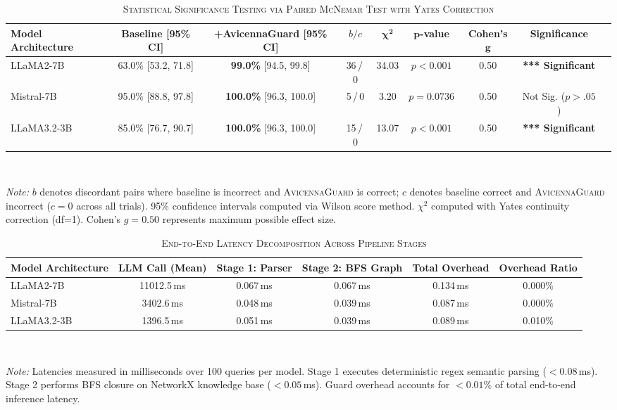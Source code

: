 \documentclass[journal]{IEEEtran}
\begin{document}
\begin{table}[t]
\centering
\caption{\textsc{Statistical Significance Testing via Paired McNemar Test with Yates Correction}}
\label{tab:mcnemar_significance}
\begin{tabular}{lcccccccc}
  \toprule
  \textbf{Model Architecture} & \textbf{Baseline [95\% CI]} & \textbf{+AvicennaGuard [95\% CI]} & \textbf{$b / c$} & $\boldsymbol{\chi^2}$ & $\boldsymbol{p}$\textbf{-value} & \textbf{Cohen's} $\boldsymbol{g}$ & \textbf{Significance} \\
  \midrule
  LLaMA2-7B & 63.0\% [53.2, 71.8] & \textbf{99.0\%} [94.5, 99.8] & 36\,/\,0 & 34.03 & $p < 0.001$ & 0.50 & \textbf{*** Significant} \\
  Mistral-7B & 95.0\% [88.8, 97.8] & \textbf{100.0\%} [96.3, 100.0] & 5\,/\,0 & 3.20 & $p = 0.0736$ & 0.50 & Not Sig. ($p > .05$) \\
  LLaMA3.2-3B & 85.0\% [76.7, 90.7] & \textbf{100.0\%} [96.3, 100.0] & 15\,/\,0 & 13.07 & $p < 0.001$ & 0.50 & \textbf{*** Significant} \\
  \bottomrule
\end{tabular}
\vspace{1mm}
\\[-1mm]
\raggedright
\footnotesize{\textit{Note:} $b$ denotes discordant pairs where baseline is incorrect and \textsc{AvicennaGuard} is correct; $c$ denotes baseline correct and \textsc{AvicennaGuard} incorrect ($c=0$ across all trials). 95\% confidence intervals computed via Wilson score method. $\chi^2$ computed with Yates continuity correction (df=1). Cohen's $g = 0.50$ represents maximum possible effect size.}
\end{table}

\vspace{0.5cm}

\begin{table}[t]
\centering
\caption{\textsc{End-to-End Latency Decomposition Across Pipeline Stages}}
\label{tab:latency_breakdown}
\begin{tabular}{lccccc}
  \toprule
  \textbf{Model Architecture} & \textbf{LLM Call (Mean)} & \textbf{Stage 1: Parser} & \textbf{Stage 2: BFS Graph} & \textbf{Total Overhead} & \textbf{Overhead Ratio} \\
  \midrule
  LLaMA2-7B & 11012.5\,ms & 0.067\,ms & 0.067\,ms & 0.134\,ms & 0.000\% \\
  Mistral-7B & 3402.6\,ms & 0.048\,ms & 0.039\,ms & 0.087\,ms & 0.000\% \\
  LLaMA3.2-3B & 1396.5\,ms & 0.051\,ms & 0.039\,ms & 0.089\,ms & 0.010\% \\
  \bottomrule
\end{tabular}
\vspace{1mm}
\\[-1mm]
\raggedright
\footnotesize{\textit{Note:} Latencies measured in milliseconds over 100 queries per model. Stage 1 executes deterministic regex semantic parsing ($<0.08\,$ms). Stage 2 performs BFS closure on NetworkX knowledge base ($<0.05\,$ms). Guard overhead accounts for $<0.01\%$ of total end-to-end inference latency.}
\end{table}
\end{document}
